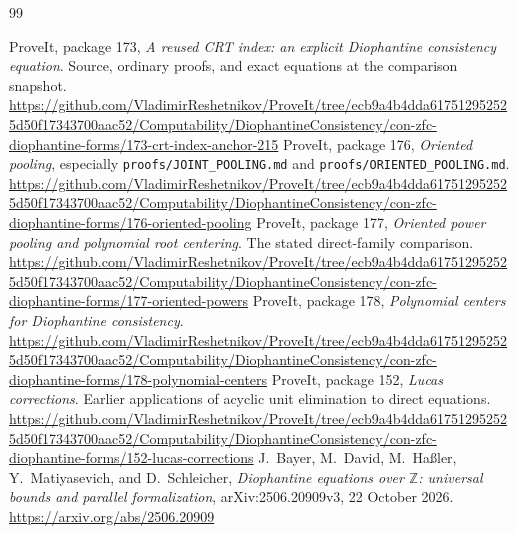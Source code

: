 \documentclass[11pt]{article}
\theoremstyle{definition}\newtheorem{definition}[theorem]{Definition}
\theoremstyle{remark}\newtheorem{remark}[theorem]{Remark}
\newcommand{\Z}{\mathbb Z}\newcommand{\N}{\mathbb N}
\begin{document}
\begin{thebibliography}{99}
\raggedright
{} ProveIt, package 173, \emph{A reused CRT index: an explicit
Diophantine consistency equation}. Source, ordinary proofs, and exact
equations at the comparison snapshot.\newline
\url{https://github.com/VladimirReshetnikov/ProveIt/tree/ecb9a4b4dda617512952525d50f17343700aac52/Computability/DiophantineConsistency/con-zfc-diophantine-forms/173-crt-index-anchor-215}
 ProveIt, package 176, \emph{Oriented pooling}, especially
\texttt{proofs/JOINT\_POOLING.md} and
\texttt{proofs/ORIENTED\_POOLING.md}.\newline
\url{https://github.com/VladimirReshetnikov/ProveIt/tree/ecb9a4b4dda617512952525d50f17343700aac52/Computability/DiophantineConsistency/con-zfc-diophantine-forms/176-oriented-pooling}
 ProveIt, package 177, \emph{Oriented power pooling and
polynomial root centering}. The stated direct-family comparison.\newline
\url{https://github.com/VladimirReshetnikov/ProveIt/tree/ecb9a4b4dda617512952525d50f17343700aac52/Computability/DiophantineConsistency/con-zfc-diophantine-forms/177-oriented-powers}
 ProveIt, package 178, \emph{Polynomial centers for
Diophantine consistency}.\newline
\url{https://github.com/VladimirReshetnikov/ProveIt/tree/ecb9a4b4dda617512952525d50f17343700aac52/Computability/DiophantineConsistency/con-zfc-diophantine-forms/178-polynomial-centers}
 ProveIt, package 152, \emph{Lucas corrections}.
Earlier applications of acyclic unit elimination to direct equations.\newline
\url{https://github.com/VladimirReshetnikov/ProveIt/tree/ecb9a4b4dda617512952525d50f17343700aac52/Computability/DiophantineConsistency/con-zfc-diophantine-forms/152-lucas-corrections}
 J.~Bayer, M.~David, M.~Ha\ss ler, Y.~Matiyasevich,
and D.~Schleicher, \emph{Diophantine equations over $\Z$: universal
bounds and parallel formalization}, arXiv:2506.20909v3, 22 October 2026.\newline
\url{https://arxiv.org/abs/2506.20909}
\end{thebibliography}
\end{document}
